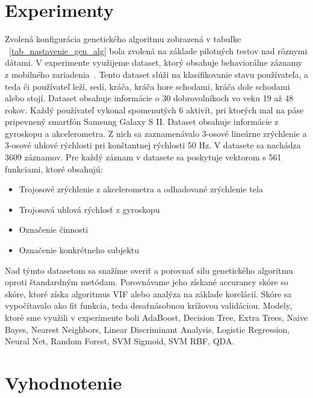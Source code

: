 \documentclass[runningheads]{llncs}
\begin{document}
\section{Experimenty}

Zvolená konfigurácia genetického algoritmu zobrazená v tabuľke ~\ref{tab_nastavenie_gen_alg} bola zvolená na 
základe pilotných testov nad rôznymi dátami. V experimente využijeme dataset, ktorý obsahuje behaviorálne 
záznamy z mobilného zariadenia~\cite{ref_dataset_anguita,ref_dataset}. Tento dataset slúži na klasifikovanie
stavu používateľa, a teda či používateľ leží, sedí, kráča, kráča hore schodami, kráča dole schodami alebo stojí.
Dataset obsahuje informácie o 30 dobrovolníkoch vo veku 19 až 48 rokov. Každý používateľ vykonal spomenutých
6 aktivít, pri ktorých mal na páse pripevnený smartfón Samsung Galaxy S II. Dataset obsahuje informácie z 
gyroskopu a akcelerometra. Z nich sa zaznamenávalo 3-osové lineárne zrýchlenie a 3-osové uhlové rýchlosti 
pri konštantnej rýchlosti 50 Hz. V datasete sa nachádza 3609 záznamov. Pre každý záznam v datasete sa poskytuje 
vektorom s 561 funkciami, ktoré obsahujú:

\begin{itemize}
\item Trojosové zrýchlenie z akcelerometra a odhadované zrýchlenie tela
\item Trojosová uhlová rýchlosť z gyroskopu
\item Označenie činnosti
\item Označenie konkrétneho subjektu
\end{itemize}

Nad týmto datasetom sa snažíme overiť a porovnať silu genetického algoritmu oproti štandardným metódam. Porovnávame 
jeho získané accurancy skóre so skóre, ktoré získa algoritmus VIF alebo analýza na základe korelácií. Skóre sa 
vypočítavalo ako fit funkcia, teda desaťnásobnou krížovou validáciou. Modely, ktoré sme využili v experimente boli 
AdaBoost, Decision Tree, Extra Trees, Naive Bayes, Nearest Neighbors, Linear Discriminant Analysis, 
Logistic Regression, Neural Net, Random Forest, SVM Sigmoid, SVM RBF, QDA.

\section{Vyhodnotenie}
\end{document}
